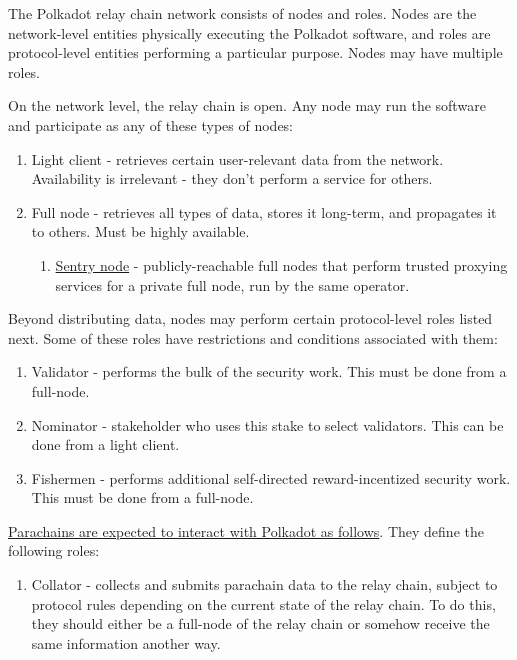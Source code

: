 The Polkadot relay chain network consists of nodes and roles. Nodes are the network-level entities physically executing the Polkadot software, and roles are protocol-level entities performing a particular purpose. Nodes may have multiple roles.

On the network level, the relay chain is open. Any node may run the software and participate as any of these types of nodes:

\begin{enumerate}
\item Light client - retrieves certain user-relevant data from the network. Availability is irrelevant - they don't perform a service for others.
\item Full node - retrieves all types of data, stores it long-term, and propagates it to others. Must be highly available.
  \begin{enumerate}
  \item \hyperref[sec:net_sentry]{Sentry node} - publicly-reachable full nodes that perform trusted proxying services for a private full node, run by the same operator.
  \end{enumerate}
\end{enumerate}

Beyond distributing data, nodes may perform certain protocol-level roles listed next. Some of these roles have restrictions and conditions associated with them:

\begin{enumerate}
\item Validator - performs the bulk of the security work. This must be done from a full-node.
\item Nominator - stakeholder who uses this stake to select validators. This can be done from a light client.
\item Fishermen - performs additional self-directed reward-incentized security work. This must be done from a full-node.
\end{enumerate}

\uline{Parachains are expected to interact with Polkadot as follows}. They define the following roles:

\begin{enumerate}
\item Collator - collects and submits parachain data to the relay chain, subject to protocol rules depending on the current state of the relay chain. To do this, they should either be a full-node of the relay chain or somehow receive the same information another way.
\end{enumerate}

